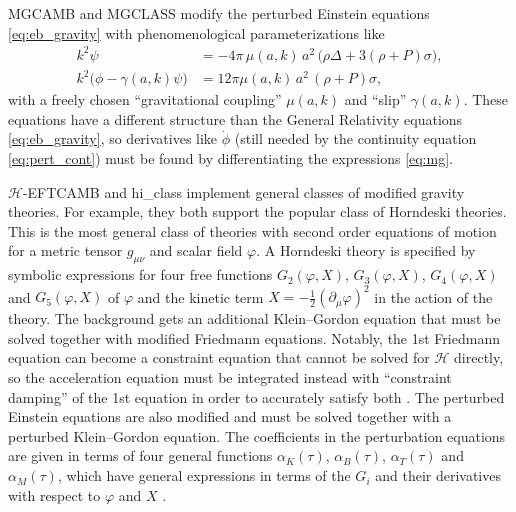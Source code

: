 \documentclass[USenglish, thumbmarks]{uiophdthesis} %
\newcommand\calH{\mathcal{H}}
\newcommand\GR{General Relativity}
\newcommand\KG{Klein--Gordon}
\begin{document}
MGCAMB \cite{zhaoSearchingModifiedGrowth2009} and
MGCLASS \cite{bakerObservationalSignaturesModified2015,sakrCosmologicalConstraintsSubhorizon2022}
modify the perturbed Einstein equations \eqref{eq:eb_gravity}
with phenomenological parameterizations like
\begin{subequations}
\label{eq:mg}
\begin{align}
k^2\psi &= -4\pi \, \mu(a,k) \, a^2 \, \big( \rho \Delta + 3(\rho+P)\sigma \big), \label{eq:mg_poisson} \\
k^2\big(\phi - \gamma(a,k) \psi\big) &= 12\pi \mu(a,k) \, a^2 \, (\rho+P)\sigma \label{eq:mg_slip} ,
\end{align}
\end{subequations}
with a freely chosen \enquote{gravitational coupling} $\mu(a,k)$ and \enquote{slip} $\gamma(a, k)$.
These equations have a different structure than the \GR{} equations \eqref{eq:eb_gravity},
so derivatives like $\dot\phi$ (still needed by the continuity equation \eqref{eq:pert_cont})
must be found by differentiating the expressions \eqref{eq:mg}.

$\mathcal{H}$-EFTCAMB \cite{huEffectiveFieldTheory2014,raveriEffectiveFieldTheory2014,yeEFTCAMBCobayaintegratedPythonwrapped2026} and
hi\_class \cite{zumalacarreguiHiclassHorndeskiCosmic2017a,belliniHiclassBackgroundEvolution2020a}
implement general classes of modified gravity theories.
For example, they both support the popular class of Horndeski theories.
This is the most general class of theories with second order equations of motion
for a metric tensor $g_{\mu\nu}$ and scalar field $\varphi$.
A Horndeski theory is specified by symbolic expressions for four free functions
$G_2(\varphi, X)$, $G_3(\varphi, X)$, $G_4(\varphi, X)$ and $G_5(\varphi, X)$
of $\varphi$ and the kinetic term $X = -\frac12(\partial_\mu \varphi)^2$ in the action of the theory.
The background gets an additional \KG{} equation that must be solved together with modified Friedmann equations.
Notably, the 1st Friedmann equation can become a constraint equation that cannot be solved for $\calH$ directly,
so the acceleration equation must be integrated instead with \enquote{constraint damping} of the 1st equation in order to accurately satisfy both \cite{belliniHiclassBackgroundEvolution2020a}.
The perturbed Einstein equations are also modified and must be solved together with a perturbed \KG{} equation.
The coefficients in the perturbation equations are given in terms of four general functions
$\alpha_K(\tau)$, $\alpha_B(\tau)$, $\alpha_T(\tau)$ and $\alpha_M(\tau)$,
which have general expressions in terms of the $G_i$ and their derivatives with respect to $\varphi$ and $X$
\cite{belliniMaximalFreedomMinimum2014a}.
\end{document}
